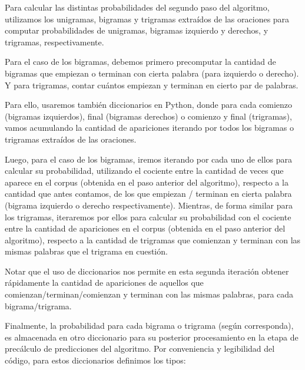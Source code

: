 \documentclass[a4paper]{article}
\begin{document}
Para calcular las distintas probabilidades del segundo paso del algoritmo, utilizamos los unigramas, bigramas y trigramas extraídos de las oraciones para computar probabilidades de unigramas, bigramas izquierdo y derechos, y trigramas, respectivamente.

Para el caso de los bigramas, debemos primero precomputar la cantidad de bigramas que empiezan o terminan con cierta palabra (para izquierdo o derecho). Y para trigramas, contar cuántos empiezan y terminan en cierto par de palabras.

Para ello, usaremos también diccionarios en Python, donde para cada comienzo (bigramas izquierdos), final (bigramas derechos) o comienzo y final (trigramas), vamos acumulando la cantidad de apariciones iterando por todos los bigramas o trigramas extraídos de las oraciones.

Luego, para el caso de los bigramas, iremos iterando por cada uno de ellos para calcular su probabilidad, utilizando el cociente entre la cantidad de veces que aparece en el corpus (obtenida en el paso anterior del algoritmo), respecto a la cantidad que antes contamos, de los que empiezan / terminan en cierta palabra (bigrama izquierdo o derecho respectivamente). Mientras, de forma similar para los trigramas, iteraremos por ellos para calcular su probabilidad con el cociente entre la cantidad de apariciones en el corpus (obtenida en el paso anterior del algoritmo), respecto a la cantidad de trigramas que comienzan y terminan con las mismas palabras que el trigrama en cuestión.

Notar que el uso de diccionarios nos permite en esta segunda iteración obtener rápidamente la cantidad de apariciones de aquellos que comienzan/terminan/comienzan y terminan con las mismas palabras, para cada bigrama/trigrama.

Finalmente, la probabilidad para cada bigrama o trigrama (según corresponda), es almacenada en otro diccionario para su posterior procesamiento en la etapa de precálculo de predicciones del algoritmo. Por conveniencia y legibilidad del código, para estos diccionarios definimos los tipos:
\end{document}
